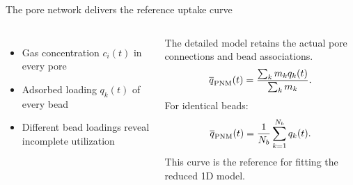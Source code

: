 \begin{frame}{The pore network delivers the reference uptake curve}

\begin{columns}[T,onlytextwidth]
\small
\begin{itemize}
\item Gas concentration $c_i(t)$ in every pore
\item Adsorbed loading $q_k(t)$ of every bead
\item Different bead loadings reveal incomplete utilization
\end{itemize}
\medskip
The detailed model retains the actual pore connections and bead associations.
\small
\[
\overline q_{\rm PNM}(t)=\frac{\sum_k m_k q_k(t)}{\sum_k m_k}.
\]
For identical beads:
\[
\overline q_{\rm PNM}(t)=\frac{1}{N_b}\sum_{k=1}^{N_b}q_k(t).
\]
This curve is the reference for fitting the reduced 1D model.
\end{columns}
\vspace{0.25cm}

\end{frame}

